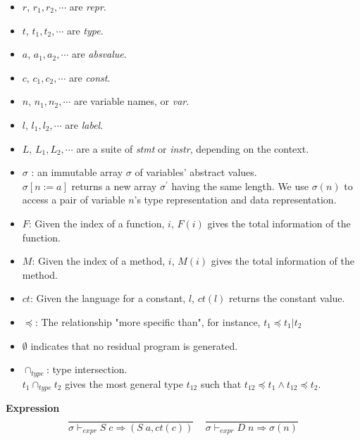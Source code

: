 \documentclass[12pt, a4paper]{report}
\newcommand{\gap}{ \;\;\;\; }
\begin{document}
\begin{itemize}
    \item $r$, $r_1, r_2, \cdots$ are \textit{repr}.
    \item $t$, $t_1, t_2, \cdots$ are \textit{type}.
    \item $a$, $a_1, a_2, \cdots$ are \textit{absvalue}.
    \item $c$, $c_1, c_2, \cdots$ are \textit{const}.
    \item $n$, $n_1, n_2, \cdots$ are variable names, or \textit{var}.
    \item $l$, $l_1, l_2, \cdots$ are \textit{label}.
    \item $L$, $L_1, L_2, \cdots$ are a suite of \textit{stmt} or \textit{instr}, depending on the context.
    \item $\sigma$ : an immutable array $\sigma$ of variables' abstract values. \vbox{}\\
        $\sigma[n := a]$ returns a new array $\sigma^{'}$ having the same length.
        We use $\sigma(n)$ to access a pair of variable $n$'s type representation and data representation.
    \item $F$: Given the index of a function, $i$, $F(i)$ gives the total information of the function.
    \item $M$: Given the index of a method, $i$, $M(i)$ gives the total information of the method.
    \item $ct$: Given the language for a constant, $l$, $ct(l)$ returns the constant value.
    \item $\preceq$: The relationship "more specific than", for instance, $t_1 \preceq t_1 | t_2 $
    \item $\emptyset$ indicates that no residual program is generated.
    \item $\cap_{type}$: type intersection. \vbox{} \\
        $t_1 \cap_{type} t_2$ gives the most general type $t_{12}$ such that
        $t_{12} \preceq t_1 \wedge t_{12} \preceq t_2$.
\end{itemize}


\textbf{Expression}
\begin{equation*}
    \begin{split}
        \dfrac{
        }{
            \sigma \vdash_{expr} S\;c \Rightarrow (S\;a, ct(c))
        }
        \gap
        \dfrac{
        }{
            \sigma \vdash_{expr} D\;n \Rightarrow \sigma(n)
        }
    \end{split}
\end{equation*}
\end{document}
